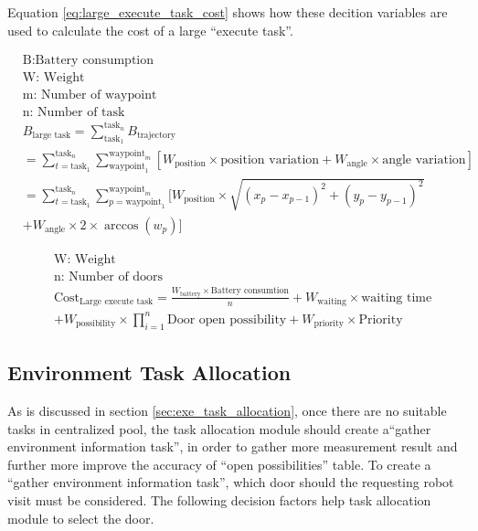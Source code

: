 Equation \ref{eq:large_execute_task_cost} shows how these decition variables are used to calculate the cost of a large ``execute task''.

\begin{equation}
\begin{aligned}
\label{eq:battery_consumption}
& \mbox{B:Battery consumption } \\
& \mbox{W: Weight } \\
& \mbox{m: Number of waypoint } \\
& \mbox{n: Number of task} \\
& B_{\mbox{large task}} = \sum_{\mbox{task}_1}^{\mbox{task}_n} B_{\mbox{trajectory}} \\
& = \sum_{t = \mbox{task}_1}^{\mbox{task}_n} \sum_{\mbox{waypoint}_1}^{\mbox{waypoint}_m} [W_{\mbox{position}} \times \mbox{position variation}+W_{\mbox{angle}}  \times \mbox{angle variation}]\\
& = \sum_{t = \mbox{task}_1}^{\mbox{task}_n} \sum_{p = \mbox{waypoint}_1}^{\mbox{waypoint}_m} [ W_{\mbox{position}} \times \sqrt{(x_p-x_{p-1} )^2+(y_p-y_{p-1} )^2} \\
&   + W_{\mbox{angle}} \times 2 \times \arccos(w_p)] 
\end{aligned}
\end{equation}


\begin{equation}
	\label{eq:large_execute_task_cost} 
	\begin{aligned}
	& \mbox{W: Weight } \\
	& \mbox{n: Number of doors} \\
	& \mbox{Cost}_{\mbox{Large execute task}} = \frac{W_{\mbox{battery}} \times \mbox{Battery consumtion}}{n} + W_{\mbox{waiting}} \times \mbox{waiting time} \\
	& + W_{\mbox{possibility}} \times \prod\limits_{i=1}^n \mbox{Door open possibility}  + W_{\mbox{priority}} \times \mbox{Priority}
	\end{aligned}
\end{equation}


\subsection{Environment Task Allocation}
As is discussed in section \ref{sec:exe_task_allocation}, once there are no suitable tasks in centralized pool, the task allocation module should create a``gather environment information task'', in order to gather more measurement result and further more improve the accuracy of ``open possibilities'' table.
To create a ``gather environment information task'', which door should the requesting robot visit must be considered. The following decision factors help task allocation module to select the door.

